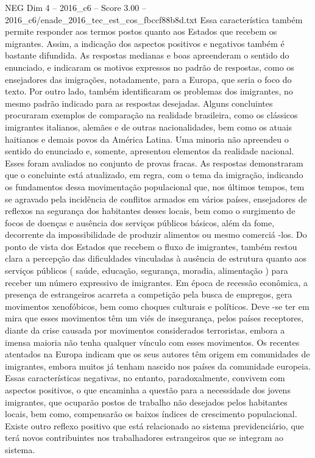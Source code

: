 \begin{textsample}{NEG Dim 4 – 2016\_c6 – Score 3.00 – 2016\_c6/enade\_2016\_tec\_est\_cos\_fbccf88b8d.txt}
Essa característica também permite responder aos termos postos quanto aos Estados que recebem os migrantes.
Assim, a indicação dos aspectos positivos e negativos também é bastante difundida.
As respostas medianas e boas apreenderam o sentido do enunciado, e indicaram os motivos expressos no padrão de respostas, como os ensejadores das imigrações, notadamente, para a Europa, que seria o foco do texto.
Por outro lado, também identificaram os problemas dos imigrantes, no mesmo padrão indicado para as respostas desejadas.
Alguns concluintes procuraram exemplos de comparação na realidade brasileira, como os clássicos imigrantes italianos, alemães e de outras nacionalidades, bem como os atuais haitianos e demais povos da América Latina.
Uma minoria não apreendeu o sentido do enunciado e, somente, apresentou elementos da realidade nacional.
Esses foram avaliados no conjunto de provas fracas.
As respostas demonstraram que o concluinte está atualizado, em regra, com o tema da imigração, indicando os fundamentos dessa movimentação populacional que, nos últimos tempos, tem se agravado pela incidência de conflitos armados em vários países, ensejadores de reflexos na segurança dos habitantes desses locais, bem como o surgimento de focos de doenças e ausência dos serviços públicos básicos, além da fome, decorrente da impossibilidade de produzir alimentos ou mesmo comerciá -los.
Do ponto de vista dos Estados que recebem o fluxo de imigrantes, também restou clara a percepção das dificuldades vinculadas à ausência de estrutura quanto aos serviços públicos ( saúde, educação, segurança, moradia, alimentação ) para receber um número expressivo de imigrantes.
Em época de recessão econômica, a presença de estrangeiros acarreta a competição pela busca de empregos, gera movimentos xenofóbicos, bem como choques culturais e políticos.
Deve -se ter em mira que esses movimentos têm um viés de insegurança, pelos países receptores, diante da crise causada por movimentos considerados terroristas, embora a imensa maioria não tenha qualquer vínculo com esses movimentos.
Os recentes atentados na Europa indicam que os seus autores têm origem em comunidades de imigrantes, embora muitos já tenham nascido nos países da comunidade europeia.
Essas características negativas, no entanto, paradoxalmente, convivem com aspectos positivos, o que encaminha a questão para a necessidade dos jovens imigrantes, que ocuparão postos de trabalho não desejados pelos habitantes locais, bem como, compensarão os baixos índices de crescimento populacional.
Existe outro reflexo positivo que está relacionado ao sistema previdenciário, que terá novos contribuintes nos trabalhadores estrangeiros que se integram ao sistema.

\end{textsample}
